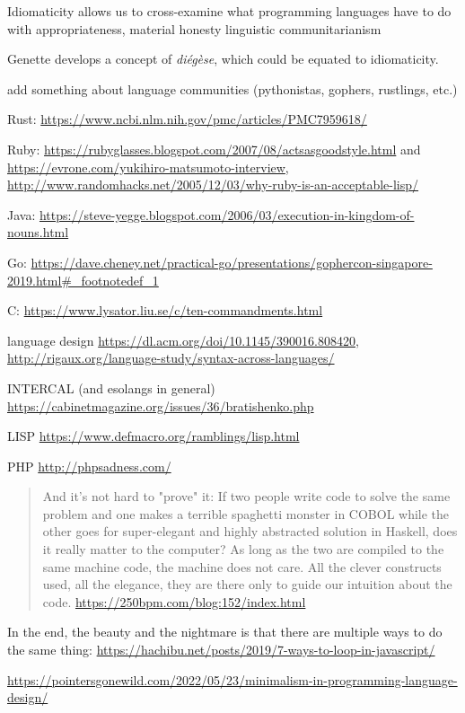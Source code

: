 Idiomaticity allows us to cross-examine what programming languages have to do with appropriateness, material honesty linguistic communitarianism


Genette develops a concept of \emph{diégèse}, which could be equated to idiomaticity.

add something about language communities (pythonistas, gophers, rustlings, etc.)

Rust: \url{https://www.ncbi.nlm.nih.gov/pmc/articles/PMC7959618/}

Ruby: \url{https://rubyglasses.blogspot.com/2007/08/actsasgoodstyle.html} and \url{https://evrone.com/yukihiro-matsumoto-interview}, \url{http://www.randomhacks.net/2005/12/03/why-ruby-is-an-acceptable-lisp/}

Java: \url{https://steve-yegge.blogspot.com/2006/03/execution-in-kingdom-of-nouns.html}

Go: \url{https://dave.cheney.net/practical-go/presentations/gophercon-singapore-2019.html#_footnotedef_1}

C: \url{https://www.lysator.liu.se/c/ten-commandments.html}

language design \url{https://dl.acm.org/doi/10.1145/390016.808420}, \url{http://rigaux.org/language-study/syntax-across-languages/}

INTERCAL (and esolangs in general) \url{https://cabinetmagazine.org/issues/36/bratishenko.php}

LISP \url{https://www.defmacro.org/ramblings/lisp.html}

PHP \url{http://phpsadness.com/}

\begin{quote}
  And it's not hard to "prove" it: If two people write code to solve the same problem and one makes a terrible spaghetti monster in COBOL while the other goes for super-elegant and highly abstracted solution in Haskell, does it really matter to the computer? As long as the two are compiled to the same machine code, the machine does not care. All the clever constructs used, all the elegance, they are there only to guide our intuition about the code. \url{https://250bpm.com/blog:152/index.html}
\end{quote}

In the end, the beauty and the nightmare is that there are multiple ways to do the same thing: \url{https://hachibu.net/posts/2019/7-ways-to-loop-in-javascript/}

\url{https://pointersgonewild.com/2022/05/23/minimalism-in-programming-language-design/}

